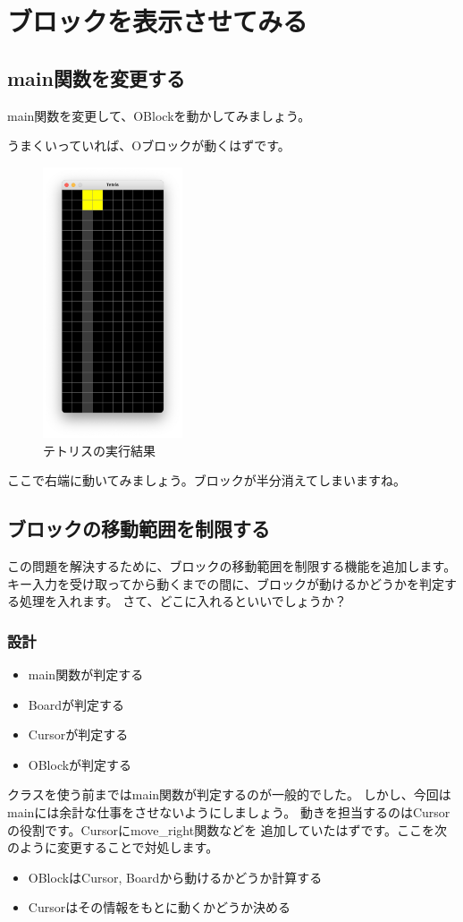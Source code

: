 \section{ブロックを表示させてみる}
\subsection{main関数を変更する}
main関数を変更して、OBlockを動かしてみましょう。

うまくいっていれば、Oブロックが動くはずです。
\newpage
\begin{figure}[h]
  \centering
  \includegraphics[height=80mm]{images/TetrisCH7.png}
  \caption{テトリスの実行結果}
\end{figure}
\newpage
ここで右端に動いてみましょう。ブロックが半分消えてしまいますね。

\subsection{ブロックの移動範囲を制限する}
この問題を解決するために、ブロックの移動範囲を制限する機能を追加します。
キー入力を受け取ってから動くまでの間に、ブロックが動けるかどうかを判定する処理を入れます。
さて、どこに入れるといいでしょうか？
\subsubsection{設計}
\begin{itemize}
  \item main関数が判定する
  \item Boardが判定する
  \item Cursorが判定する
  \item OBlockが判定する
\end{itemize}
クラスを使う前まではmain関数が判定するのが一般的でした。
しかし、今回はmainには余計な仕事をさせないようにしましょう。
動きを担当するのはCursorの役割です。Cursorにmove\_right関数などを
追加していたはずです。ここを次のように変更することで対処します。
\begin{itemize}
  \item OBlockはCursor, Boardから動けるかどうか計算する
  \item Cursorはその情報をもとに動くかどうか決める
\end{itemize}

